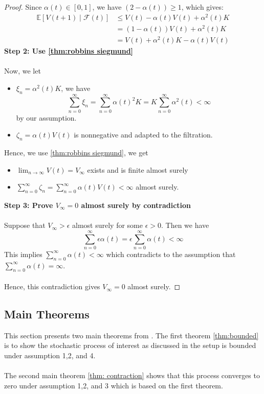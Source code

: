 \begin{proof}
\noindent Since $\alpha(t) \in [0,1]$, we have $(2 - \alpha(t)) \geq 1$, which gives:
\begin{align*}
\mathbb{E}[V(t+1) \mid \mathcal{F}(t)] &\leq V(t) - \alpha(t)V(t) + \alpha^2(t)K \\
&= (1 - \alpha(t))V(t) + \alpha^2(t)K\\
&= V(t) + \alpha^2(t) K -\alpha(t) V(t)
\end{align*}
\textbf{Step 2: Use \autoref{thm:robbins siegmund}}\\
\\
\noindent Now, we let
\begin{itemize}
    \item $\xi_n = \alpha^2(t)K$, we have 
    $$
    \sum_{n=0}^\infty \xi_n  = \sum_{n=0}^\infty \alpha(t)^2K = K\sum_{n=0}^\infty \alpha^2(t) <\infty
    $$
    by our assumption. 
    \item $\zeta_n = \alpha(t)V(t)$ is nonnegative and adapted to the filtration. 
\end{itemize}
Hence, we use \autoref{thm:robbins siegmund}, we get
\begin{itemize}
    \item $\lim_{n\to\infty} V(t) = V_\infty$ exists and is finite almost surely
    \item $\sum_{n=0}^\infty \zeta_n = \sum_{n=0}^\infty \alpha(t) V(t)<\infty$ almost surely.
\end{itemize}
\textbf{Step 3: Prove $V_\infty =0$ almost surely by contradiction}\\
\\
Suppose that $V_\infty>\epsilon$ almost surely for some $\epsilon>0$. Then we have
$$
\sum_{n=0}^\infty \epsilon \alpha(t) =\epsilon\sum_{n=0}^\infty \alpha(t) <\infty
$$
This implies $\sum_{n=0}^\infty \alpha(t)<\infty$ which contradicts to the assumption that $\sum_{n=0}^\infty \alpha(t) = \infty$.\\
\\
Hence, this contradiction gives $V_\infty =0$ almost surely.
\end{proof}
\newpage

\subsection{Main Theorems}
This section presents two main theorems from \cite{tsitsiklis1994asynchronous}. The first theorem \autoref{thm:bounded} is to show the stochastic process of interest as discussed in the setup is bounded under assumption 1,2, and 4.\\
\\
The second main theorem \autoref{thm: contraction} shows that this process converges to zero under assumption 1,2, and 3 which is based on the first theorem.
